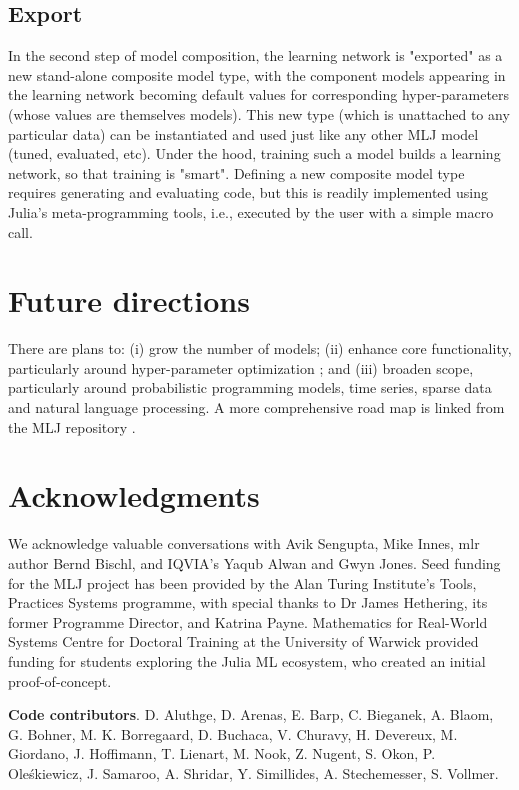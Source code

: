 \documentclass{article}
\begin{document}
\subsection{Export}

In the second step of model composition, the learning network is
"exported" as a new stand-alone composite model type, with the
component models appearing in the learning network becoming default
values for corresponding hyper-parameters (whose values are themselves
models). This new type (which is unattached to any particular data)
can be instantiated and used just like any other MLJ model (tuned,
evaluated, etc). Under the hood, training such a model builds a
learning network, so that training is "smart". Defining a new
composite model type requires generating and evaluating code, but this
is readily implemented using Julia's meta-programming tools, i.e.,
executed by the user with a simple macro call.

\section{Future directions}

There are plans to: (i) grow the number of models; (ii) enhance core
functionality, particularly around hyper-parameter optimization
\cite{MLJTuning}; and (iii) broaden scope, particularly around
probabilistic programming models, time series, sparse data and natural
language processing. A more comprehensive road map is linked from the
MLJ repository \cite{MLJ}.

\section*{Acknowledgments}

We acknowledge valuable conversations with Avik Sengupta, Mike Innes,
mlr author Bernd Bischl, and IQVIA's Yaqub Alwan and Gwyn Jones. Seed
funding for the MLJ project has been provided by the Alan Turing
Institute's Tools, Practices Systems programme, with special thanks
to Dr James Hethering, its former Programme Director, and Katrina
Payne. Mathematics for Real-World Systems Centre for Doctoral Training
at the University of Warwick provided funding for students exploring
the Julia ML ecosystem, who created an initial proof-of-concept.

\textbf{Code contributors}. D. Aluthge, D. Arenas, E. Barp,
C. Bieganek, A. Blaom, G. Bohner, M. K. Borregaard, D. Buchaca,
V. Churavy, H. Devereux, M. Giordano, J. Hoffimann, T. Lienart,
M. Nook, Z. Nugent, S. Okon, P. Oleśkiewicz, J. Samaroo, A. Shridar,
Y. Simillides, A. Stechemesser, S. Vollmer.
\end{document}
